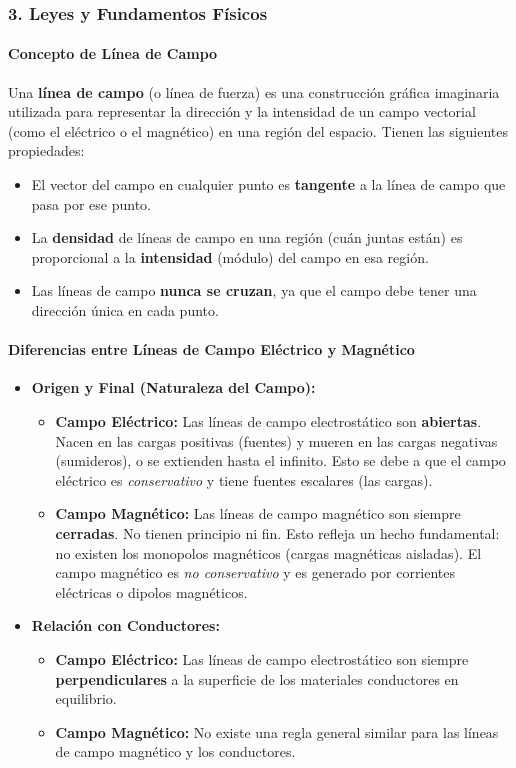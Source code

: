 \subsubsection*{3. Leyes y Fundamentos Físicos}
\paragraph{Concepto de Línea de Campo}
Una \textbf{línea de campo} (o línea de fuerza) es una construcción gráfica imaginaria utilizada para representar la dirección y la intensidad de un campo vectorial (como el eléctrico o el magnético) en una región del espacio. Tienen las siguientes propiedades:
\begin{itemize}
    \item El vector del campo en cualquier punto es \textbf{tangente} a la línea de campo que pasa por ese punto.
    \item La \textbf{densidad} de líneas de campo en una región (cuán juntas están) es proporcional a la \textbf{intensidad} (módulo) del campo en esa región.
    \item Las líneas de campo \textbf{nunca se cruzan}, ya que el campo debe tener una dirección única en cada punto.
\end{itemize}

\paragraph{Diferencias entre Líneas de Campo Eléctrico y Magnético}
\begin{itemize}
    \item \textbf{Origen y Final (Naturaleza del Campo):}
    \begin{itemize}
        \item \textbf{Campo Eléctrico:} Las líneas de campo electrostático son \textbf{abiertas}. Nacen en las cargas positivas (fuentes) y mueren en las cargas negativas (sumideros), o se extienden hasta el infinito. Esto se debe a que el campo eléctrico es \textit{conservativo} y tiene fuentes escalares (las cargas).
        \item \textbf{Campo Magnético:} Las líneas de campo magnético son siempre \textbf{cerradas}. No tienen principio ni fin. Esto refleja un hecho fundamental: no existen los monopolos magnéticos (cargas magnéticas aisladas). El campo magnético es \textit{no conservativo} y es generado por corrientes eléctricas o dipolos magnéticos.
    \end{itemize}
    \item \textbf{Relación con Conductores:}
    \begin{itemize}
        \item \textbf{Campo Eléctrico:} Las líneas de campo electrostático son siempre \textbf{perpendiculares} a la superficie de los materiales conductores en equilibrio.
        \item \textbf{Campo Magnético:} No existe una regla general similar para las líneas de campo magnético y los conductores.
    \end{itemize}
\end{itemize}

